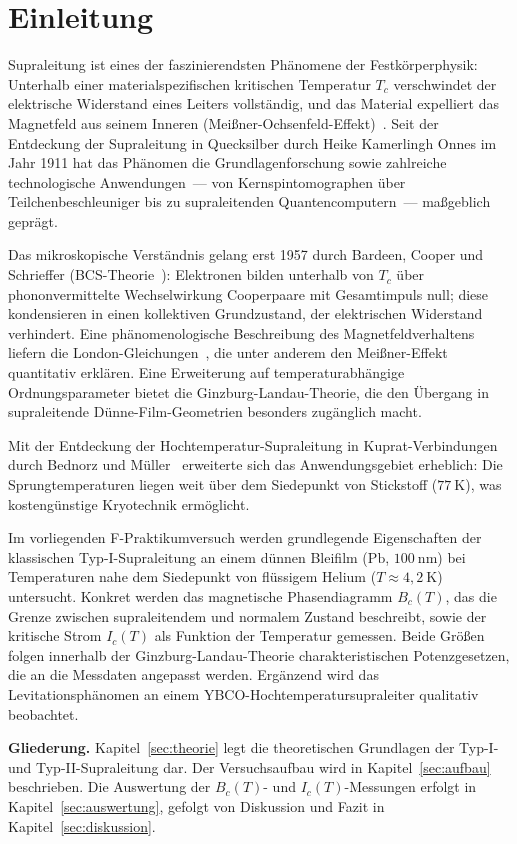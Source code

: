 \section{Einleitung}

Supraleitung ist eines der faszinierendsten Phänomene der Festkörperphysik: Unterhalb einer materialspezifischen kritischen Temperatur $T_c$ verschwindet der elektrische Widerstand eines Leiters vollständig, und das Material expelliert das Magnetfeld aus seinem Inneren
(Meißner-Ochsenfeld-Effekt)~\cite{Meissner1933}.
Seit der Entdeckung der Supraleitung in Quecksilber durch Heike Kamerlingh Onnes im Jahr 1911 hat das Phänomen die Grundlagenforschung sowie zahlreiche technologische Anwendungen~--- von Kernspin\-tomographen über Teilchenbeschleuniger bis zu supraleitenden Quantencomputern~--- maßgeblich geprägt.

Das mikroskopische Verständnis gelang erst 1957 durch Bardeen, Cooper und Schrieffer
(BCS-Theorie~\cite{BCS1957}): Elektronen bilden unterhalb von $T_c$ über phononvermittelte Wechselwirkung Cooperpaare mit Gesamtimpuls null; diese kondensieren in einen kollektiven Grundzustand, der elektrischen Widerstand verhindert.
Eine phänomenologische Beschreibung des Magnetfeldverhaltens liefern die London-Gleichungen~\cite{London1935}, die unter anderem den Meißner-Effekt quantitativ erklären.
Eine Erweiterung auf temperaturabhängige Ordnungsparameter bietet die Ginzburg-Landau-Theorie, die den Übergang in supraleitende Dünne-Film-Geometrien besonders zugänglich macht.

Mit der Entdeckung der Hochtemperatur-Supraleitung in Kuprat-Verbindungen durch Bednorz und Müller~\cite{Bednorz1986} erweiterte sich das Anwendungsgebiet erheblich: Die Sprungtemperaturen liegen weit über dem Siedepunkt von Stickstoff ($77~\mathrm{K}$), was kostengünstige Kryotechnik ermöglicht.

Im vorliegenden F-Praktikumversuch werden grundlegende Eigenschaften der klassischen Typ-I-Supraleitung an einem dünnen Bleifilm ($\mathrm{Pb}$, $100~\mathrm{nm}$) bei Temperaturen nahe dem Siedepunkt von flüssigem Helium ($T \approx 4{,}2~\mathrm{K}$) untersucht.
Konkret werden das magnetische Phasendiagramm $B_c(T)$, das die Grenze zwischen supraleitendem und normalem Zustand beschreibt, sowie der kritische Strom $I_c(T)$ als Funktion der Temperatur gemessen.
Beide Größen folgen innerhalb der Ginzburg-Landau-Theorie charakteristischen Potenzgesetzen, die an die Messdaten angepasst werden.
Ergänzend wird das Levitationsphänomen an einem YBCO-Hochtemperatursupraleiter qualitativ beobachtet.

\medskip\noindent
\textbf{Gliederung.}
Kapitel~\ref{sec:theorie} legt die theoretischen Grundlagen der Typ-I- und Typ-II-Supraleitung dar.
Der Versuchsaufbau wird in Kapitel~\ref{sec:aufbau} beschrieben.
Die Auswertung der $B_c(T)$- und $I_c(T)$-Messungen erfolgt in Kapitel~\ref{sec:auswertung}, gefolgt von Diskussion und Fazit in Kapitel~\ref{sec:diskussion}.
